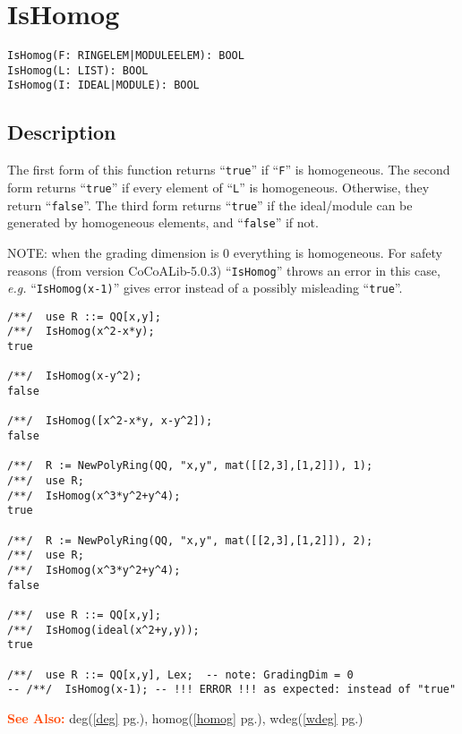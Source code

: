 \documentclass[a4paper]{mybook}
\newenvironment{command}{}{} %
\newcommand\SeeAlso{\par\textcolor{OrangeRed}{\textbf{\large See Also: }}}
\begin{document}
\section{IsHomog}
\label{IsHomog}
\begin{command} %


\begin{Verbatim}[label=syntax, rulecolor=\color{MidnightBlue},
frame=single]
IsHomog(F: RINGELEM|MODULEELEM): BOOL
IsHomog(L: LIST): BOOL
IsHomog(I: IDEAL|MODULE): BOOL
\end{Verbatim}


\subsection*{Description}

The first form of this function returns ``\verb&true&'' if ``\verb&F&'' is homogeneous.
The second form returns ``\verb&true&'' if every element of ``\verb&L&'' is homogeneous.
Otherwise, they return ``\verb&false&''.  The third form returns ``\verb&true&'' if the
ideal/module can be generated by homogeneous elements, and ``\verb&false&''
if not.
\par 
NOTE: when the grading dimension is 0 everything is homogeneous.
For safety reasons (from version CoCoALib-5.0.3) ``\verb&IsHomog&''
throws an error in this case, \textit{e.g.} ``\verb&IsHomog(x-1)&'' gives error
instead of a possibly misleading ``\verb&true&''.
\begin{Verbatim}[label=example, rulecolor=\color{PineGreen}, frame=single]
/**/  use R ::= QQ[x,y];
/**/  IsHomog(x^2-x*y);
true

/**/  IsHomog(x-y^2);
false

/**/  IsHomog([x^2-x*y, x-y^2]);
false

/**/  R := NewPolyRing(QQ, "x,y", mat([[2,3],[1,2]]), 1);
/**/  use R;
/**/  IsHomog(x^3*y^2+y^4);
true

/**/  R := NewPolyRing(QQ, "x,y", mat([[2,3],[1,2]]), 2);
/**/  use R;
/**/  IsHomog(x^3*y^2+y^4);
false

/**/  use R ::= QQ[x,y];
/**/  IsHomog(ideal(x^2+y,y));
true

/**/  use R ::= QQ[x,y], Lex;  -- note: GradingDim = 0
-- /**/  IsHomog(x-1); -- !!! ERROR !!! as expected: instead of "true"
\end{Verbatim}


\SeeAlso %
  deg(\ref{deg} pg.\pageref{deg}), 
    homog(\ref{homog} pg.\pageref{homog}), 
    wdeg(\ref{wdeg} pg.\pageref{wdeg})
\end{command} %
\end{document}
